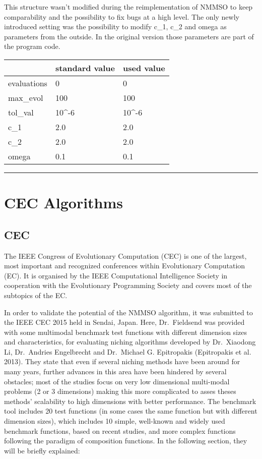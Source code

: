 \documentclass[12pt,a4paper]{article}
\begin{document}
This structure wasn't modified during the reimplementation of NMMSO to
keep comparability and the possibility to fix bugs at a high level. The
only newly introduced setting was the possibility to modify c\_1, c\_2
and omega as parameters from the outside. In the original version those
parameters are part of the program code.

\begin{longtable}[c]{@{}lll@{}}
\toprule
& standard value & used value\tabularnewline
\midrule
\endhead
evaluations & 0 & 0\tabularnewline
max\_evol & 100 & 100\tabularnewline
tol\_val & 10\^{}-6 & 10\^{}-6\tabularnewline
c\_1 & 2.0 & 2.0\tabularnewline
c\_2 & 2.0 & 2.0\tabularnewline
omega & 0.1 & 0.1\tabularnewline
\bottomrule
\end{longtable}

\begin{center}\rule{0.5\linewidth}{\linethickness}\end{center}

\section{CEC Algorithms}\label{cec-algorithms}

\subsection{CEC}\label{cec}

The IEEE Congress of Evolutionary Computation (CEC) is one of the
largest, most important and recognized conferences within Evolutionary
Computation (EC). It is organised by the IEEE Computational Intelligence
Society in cooperation with the Evolutionary Programming Society and
covers most of the subtopics of the EC.

In order to validate the potential of the NMMSO algorithm, it was
submitted to the IEEE CEC 2015 held in Sendai, Japan. Here,
Dr.~Fieldsend was provided with some multimodal benchmark test functions
with different dimension sizes and characteristics, for evaluating
niching algorithms developed by Dr.~Xiaodong Li, Dr.~Andries Engelbrecht
and Dr.~Michael G. Epitropakis (Epitropakis et al. 2013). They state
that even if several niching methods have been around for many years,
further advances in this area have been hindered by several obstacles;
most of the studies focus on very low dimensional multi-modal problems
(2 or 3 dimensions) making this more complicated to asses theses
methods' scalability to high dimensions with better performance. The
benchmark tool includes 20 test functions (in some cases the same
function but with different dimension sizes), which includes 10 simple,
well-known and widely used benchmark functions, based on recent studies,
and more complex functions following the paradigm of composition
functions. In the following section, they will be briefly explained:
\end{document}
